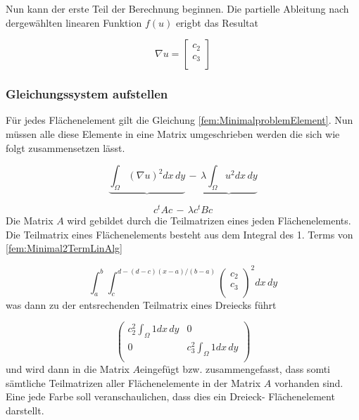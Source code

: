 Nun kann der erste Teil der Berechnung beginnen. Die partielle Ableitung nach dergewählten linearen Funktion $f(u)$ erigbt das Resultat

\begin{equation}
	\nabla u = 	
	\left[ \begin{array}{r}
	c_2  \\
	c_3 \\
	\end{array}\right]
	\label{fem:equationSchwarzquadratischP}
\end{equation} 

\subsubsection{Gleichungssystem aufstellen }

Für jedes Flächenelement gilt die Gleichung \ref{fem:MinimalproblemElement}. Nun müssen alle diese Elemente in eine Matrix umgeschrieben werden die sich wie folgt zusammensetzen lässt.

\begin{equation}
			\underbrace{ \int_{\Omega} (\nabla u)^2 dx \, dy} \, -  \, \underbrace{\lambda \int_{\Omega} u^2 dx \,dy}
			\label{fem:Minimal2TermLinAlg}
\end{equation}


\begin{equation}
			c^t Ac \, - \, \lambda c^t Bc
			\label{fem:Minimal2LinAlg}
\end{equation}
Die Matrix $A$ wird gebildet durch die Teilmatrizen eines jeden Flächenelements. Die Teilmatrix eines Flächenelements besteht  aus dem Integral des 1. Terms von \ref{fem:Minimal2TermLinAlg} 

\begin{equation}
			\int_a^b \int_c^{d-(d-c)(x-a)/(b-a)} \left( \begin{array}{c} c_2 \\ c_3\\	
\end{array} \right)^2 dx \, dy
			\label{fem:Minimal2LinAlgA}
\end{equation}
was dann zu der entsrechenden Teilmatrix eines Dreiecks führt

\begin{equation}
	\left( \begin{array}{cc}
	c_2^2 \int_{\Omega} 1 dx \, dy & 0  \\ 
	0 & c_3^2 \int_{\Omega} 1 dx \, dy  \\
	\end{array}\right)
	\label{fem:TeilmatrixA}
\end{equation}
und wird dann in die Matrix $A $eingefügt bzw. zusammengefasst, dass  somti sämtliche Teilmatrizen aller Flächenelemente in der Matrix $A$ vorhanden sind. Eine jede Farbe soll veranschaulichen, dass dies ein Dreieck- Flächenelement darstellt.

